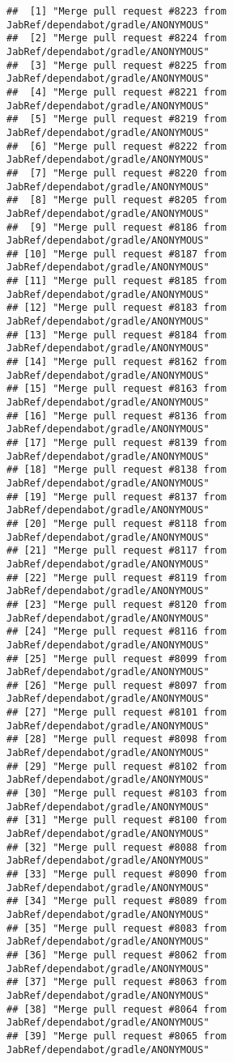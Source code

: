 \documentclass[
]{article}
\begin{document}
\begin{verbatim}
##  [1] "Merge pull request #8223 from JabRef/dependabot/gradle/ANONYMOUS"
##  [2] "Merge pull request #8224 from JabRef/dependabot/gradle/ANONYMOUS"
##  [3] "Merge pull request #8225 from JabRef/dependabot/gradle/ANONYMOUS"
##  [4] "Merge pull request #8221 from JabRef/dependabot/gradle/ANONYMOUS"
##  [5] "Merge pull request #8219 from JabRef/dependabot/gradle/ANONYMOUS"
##  [6] "Merge pull request #8222 from JabRef/dependabot/gradle/ANONYMOUS"
##  [7] "Merge pull request #8220 from JabRef/dependabot/gradle/ANONYMOUS"
##  [8] "Merge pull request #8205 from JabRef/dependabot/gradle/ANONYMOUS"
##  [9] "Merge pull request #8186 from JabRef/dependabot/gradle/ANONYMOUS"
## [10] "Merge pull request #8187 from JabRef/dependabot/gradle/ANONYMOUS"
## [11] "Merge pull request #8185 from JabRef/dependabot/gradle/ANONYMOUS"
## [12] "Merge pull request #8183 from JabRef/dependabot/gradle/ANONYMOUS"
## [13] "Merge pull request #8184 from JabRef/dependabot/gradle/ANONYMOUS"
## [14] "Merge pull request #8162 from JabRef/dependabot/gradle/ANONYMOUS"
## [15] "Merge pull request #8163 from JabRef/dependabot/gradle/ANONYMOUS"
## [16] "Merge pull request #8136 from JabRef/dependabot/gradle/ANONYMOUS"
## [17] "Merge pull request #8139 from JabRef/dependabot/gradle/ANONYMOUS"
## [18] "Merge pull request #8138 from JabRef/dependabot/gradle/ANONYMOUS"
## [19] "Merge pull request #8137 from JabRef/dependabot/gradle/ANONYMOUS"
## [20] "Merge pull request #8118 from JabRef/dependabot/gradle/ANONYMOUS"
## [21] "Merge pull request #8117 from JabRef/dependabot/gradle/ANONYMOUS"
## [22] "Merge pull request #8119 from JabRef/dependabot/gradle/ANONYMOUS"
## [23] "Merge pull request #8120 from JabRef/dependabot/gradle/ANONYMOUS"
## [24] "Merge pull request #8116 from JabRef/dependabot/gradle/ANONYMOUS"
## [25] "Merge pull request #8099 from JabRef/dependabot/gradle/ANONYMOUS"
## [26] "Merge pull request #8097 from JabRef/dependabot/gradle/ANONYMOUS"
## [27] "Merge pull request #8101 from JabRef/dependabot/gradle/ANONYMOUS"
## [28] "Merge pull request #8098 from JabRef/dependabot/gradle/ANONYMOUS"
## [29] "Merge pull request #8102 from JabRef/dependabot/gradle/ANONYMOUS"
## [30] "Merge pull request #8103 from JabRef/dependabot/gradle/ANONYMOUS"
## [31] "Merge pull request #8100 from JabRef/dependabot/gradle/ANONYMOUS"
## [32] "Merge pull request #8088 from JabRef/dependabot/gradle/ANONYMOUS"
## [33] "Merge pull request #8090 from JabRef/dependabot/gradle/ANONYMOUS"
## [34] "Merge pull request #8089 from JabRef/dependabot/gradle/ANONYMOUS"
## [35] "Merge pull request #8083 from JabRef/dependabot/gradle/ANONYMOUS"
## [36] "Merge pull request #8062 from JabRef/dependabot/gradle/ANONYMOUS"
## [37] "Merge pull request #8063 from JabRef/dependabot/gradle/ANONYMOUS"
## [38] "Merge pull request #8064 from JabRef/dependabot/gradle/ANONYMOUS"
## [39] "Merge pull request #8065 from JabRef/dependabot/gradle/ANONYMOUS"
\end{verbatim}
\end{document}
